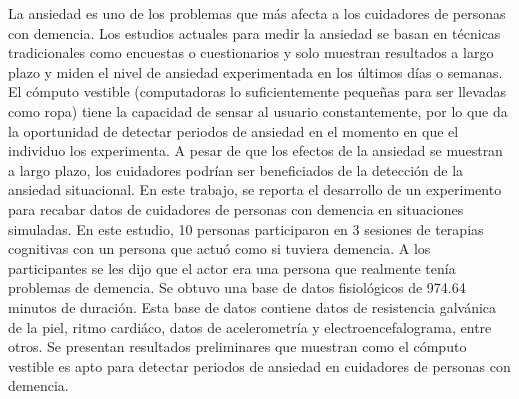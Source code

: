 La ansiedad es uno de los problemas que m\'as afecta a los cuidadores de personas con demencia. Los estudios actuales para medir la ansiedad se basan en t\'ecnicas tradicionales como encuestas o cuestionarios y solo muestran resultados a largo plazo y miden el nivel de ansiedad experimentada en los \'ultimos d\'ias o semanas. El c\'omputo vestible (computadoras lo suficientemente peque\~nas para ser llevadas como ropa) tiene la capacidad de sensar al usuario constantemente, por lo que da la oportunidad de detectar periodos de ansiedad en el momento en que el individuo los experimenta. A pesar de que los efectos de la ansiedad se muestran a largo plazo, los cuidadores podr\'ian ser beneficiados de la detecci\'on de la ansiedad situacional. En este trabajo, se reporta el desarrollo de un experimento para recabar datos de cuidadores de personas con demencia en situaciones simuladas. En este estudio, 10 personas participaron en 3 sesiones de terapias cognitivas con un persona que actu\'o como si tuviera demencia. A los participantes se les dijo que el actor era una persona que realmente ten\'ia problemas de demencia. Se obtuvo una base de datos fisiol\'ogicos de 974.64 minutos de duraci\'on. Esta base de datos contiene datos de resistencia galv\'anica de la piel, ritmo cardi\'aco, datos de acelerometr\'ia y electroencefalograma, entre otros. Se presentan resultados preliminares que muestran como el c\'omputo vestible es apto para detectar periodos de ansiedad en cuidadores de personas con demencia.
